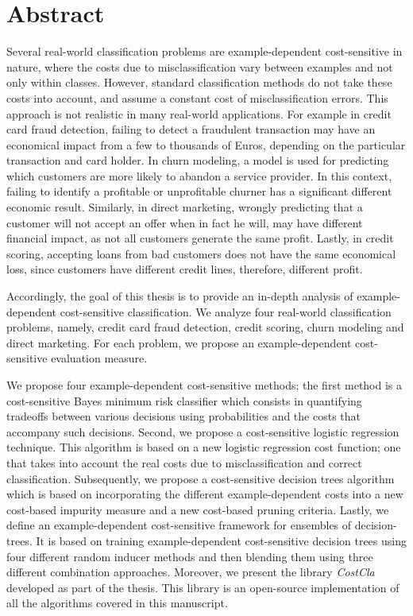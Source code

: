 \chapter*{Abstract}

Several real-world classification problems are example-dependent cost-sensitive in nature, where the 
costs due to misclassification vary between examples and not only within classes. However, standard 
classification methods do not take these costs into account, and assume a constant cost of 
misclassification errors. This approach is not realistic in many real-world applications. For  
example in credit card fraud detection, failing to detect a fraudulent transaction may have an 
economical impact from a few to thousands of Euros, depending on the particular transaction and card 
holder. In churn modeling, a model is used for predicting which customers are more likely to 
abandon a service provider. In this context, failing to identify a   profitable or unprofitable 
churner has a significant different economic   result. Similarly, in direct marketing, wrongly 
predicting that a customer   will not accept an offer when in fact he will, may have different 
financial impact, as not all   customers generate the same profit. Lastly, in credit scoring, 
accepting   loans from bad customers does not have the same economical loss, since customers have 
different   credit lines, therefore, different profit.

Accordingly, the goal of this thesis is to provide an in-depth analysis of example-dependent 
cost-sensitive classification. We analyze four real-world classification problems, namely, 
credit card fraud detection, credit scoring, churn modeling and direct marketing. For each problem, 
we propose an example-dependent cost-sensitive evaluation measure.

We propose four example-dependent cost-sensitive methods; the first method is a cost-sensitive 
Bayes minimum risk classifier which consists in quantifying tradeoffs between various decisions 
using probabilities and the costs that accompany such decisions. Second, we propose a
cost-sensitive logistic regression technique. This algorithm is based on a new logistic regression 
cost function; one that takes into account the real costs due to misclassification and correct 
classification. Subsequently, we propose a cost-sensitive decision trees algorithm which is based 
on incorporating the different example-dependent costs into a new cost-based impurity measure and a 
new cost-based pruning criteria. Lastly, we define an example-dependent cost-sensitive framework 
for ensembles of decision-trees. It is based on training example-dependent cost-sensitive 
decision trees using four different random inducer methods and then blending them using three 
different combination approaches. Moreover, we present the library \mbox{\textit{CostCla}} developed 
as part of the thesis. This library is an open-source implementation of all the algorithms covered 
in this manuscript.

